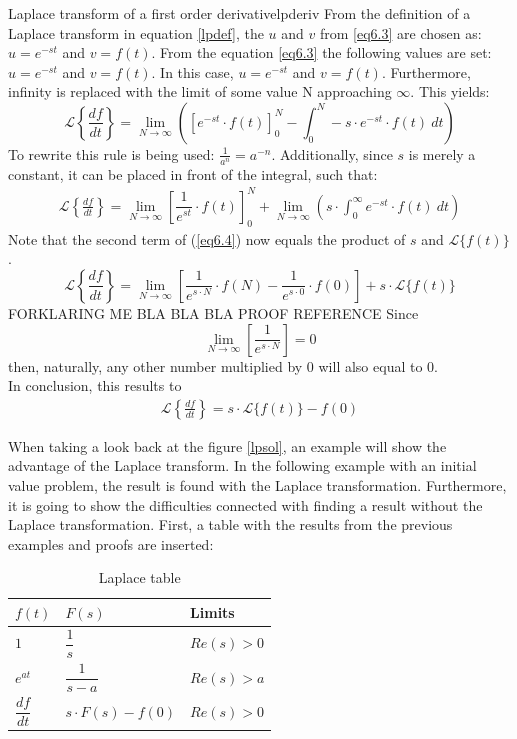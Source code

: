 \begin{prof}{Laplace transform of a first order derivative}{lpderiv}
From the definition of a Laplace transform in equation \ref{lpdef}, the $u$ and $v$ from \ref{eq6.3} are chosen as: $u=e^{-st}$ and $v=f(t)$.
From the equation \ref{eq6.3} the following values are set: $u=e^{-st}$ and $v=f(t)$.
In this case, $u=e^{-st}$ and $v=f(t)$. Furthermore, infinity is replaced with the limit of some value N approaching $\infty$. This yields:
$$\mathcal{L} \left\{\frac{df}{dt} \right\}=\lim_{N \to \infty} \left(\left[e^{-st}\cdot f(t)\right]_{0}^{N}-\int_{0}^{N} -s\cdot e^{-st}\cdot f(t)\ dt \right)$$
To rewrite this rule is being used: $\frac{1}{a^n}=a^{-n}$. Additionally, since $s$ is merely a constant, it can be placed in front of the integral, such that:
\begin{align}
\mathcal{L} \left\{\frac{df}{dt} \right\}=\lim_{N \to \infty} \left[\dfrac{1}{e^{st}}\cdot f(t)\right]_{0}^{N}+ \lim_{N \to \infty} \left(s\cdot \int_{0}^{\infty}e^{-st}\cdot f(t)\ dt \right)
\end{align} \label{eq6.4}
Note that the second term of (\ref{eq6.4}) now equals the product of $s$ and $\mathcal{L}\{f(t)\}$.
$$\mathcal{L} \left\{\frac{df}{dt} \right\} = \lim_{N \to \infty}\left[\dfrac{1}{e^{s\cdot N}}\cdot f(N)-\dfrac{1}{e^{s\cdot 0}}\cdot f(0)\right]+s\cdot \mathcal{L}\{f(t)\}$$
FORKLARING ME BLA BLA BLA PROOF REFERENCE
Since $$\lim_{N \to \infty}\left[\dfrac{1}{e^{s\cdot N}}\right]=0$$ then, naturally, any other number multiplied by 0 will also equal to 0.\\
In conclusion, this results to
\begin{align*}
\mathcal{L} \left\{\frac{df}{dt} \right\} = s\cdot \mathcal{L}\{f(t)\}-f(0)
\end{align*}
\end{prof}
When taking a look back at the figure \ref{lpsol}, an example will show the advantage of the Laplace transform. In the following example with an initial value problem, the result is found with the Laplace transformation. Furthermore, it is going to show the difficulties connected with finding a result without the Laplace transformation. First, a table with the results from the previous examples and proofs are inserted:

\begin{table}[H]
\center
\begin{tabular}{lll}
\hline
\multicolumn{1}{|l|}{$f(t)$}           & \multicolumn{1}{l|}{$F(s)$}                & \multicolumn{1}{l|}{Limits}    \\ \hline
\multicolumn{1}{|l|}{$1$}              & \multicolumn{1}{l|}{$\dfrac{1}{s}$}        & \multicolumn{1}{l|}{$Re(s)>0$} \\ \hline
\multicolumn{1}{|l|}{$e^{at}$}         & \multicolumn{1}{l|}{$\dfrac{1}{s-a}$}      & \multicolumn{1}{l|}{$Re(s)>a$} \\ \hline
\multicolumn{1}{|l|}{$\dfrac{df}{dt}$} & \multicolumn{1}{l|}{$s \cdot F(s) - f(0)$} & \multicolumn{1}{l|}{$Re(s)>0$} \\ \hline                          
\end{tabular}
\caption{Laplace table}
\label{lptable}
\end{table}

